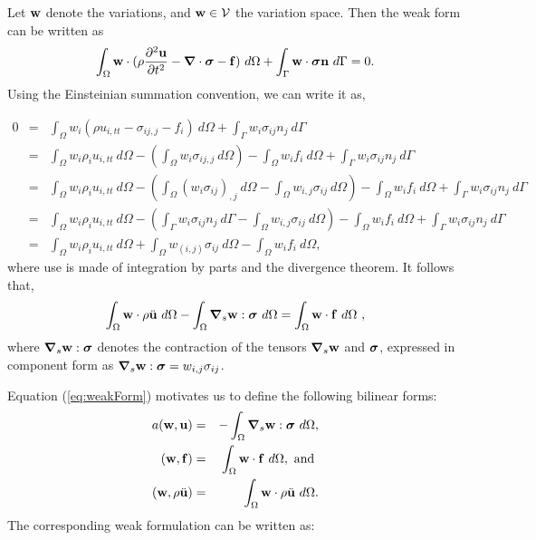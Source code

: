 Let $\mathbf{w}$ denote the variations, and $\mathbf{w} \in \mathcal{V}$ the variation space.
Then the weak form can be written as
\begin{equation}
\int_{\Omega} \mathbf{w}\cdot(\rho\frac{\partial^2 \mathbf{u}}{\partial t^2}-{\boldsymbol{\nabla}}\cdot{\boldsymbol{\sigma}} -\mathbf{f})~d\Omega + \int_{\Gamma} \mathbf{w}\cdot{\boldsymbol{\sigma}}\mathbf{n}~d\Gamma = 0.
\end{equation}
Using the Einsteinian summation convention, we can write it as,

\begin{eqnarray}
  0 & = & \int_{\Omega} w_i ( \rho u_{i, t t} - \sigma_{i j, j} - f_i )~d\Omega + \int_{\Gamma} w_i \sigma_{ij} n_j~d \Gamma \nonumber\\
	& = & \int_{\Omega} w_i \rho_i u_{i, t t}~d\Omega - 	
	\left(	\int_{\Omega} w_i\sigma_{ij,j}~d\Omega \right) -
  \int_{\Omega} w_i f_i~d\Omega + \int_{\Gamma} w_i \sigma_{ij} n_j~d\Gamma \nonumber\\
  & = & \int_{\Omega} w_i \rho_i u_{i, t t}~d\Omega - 	
	\left(	\int_{\Omega} (w_i\sigma_{ij})_{,j}~d\Omega - \int_{\Omega} w_{i,j}\sigma_{ij}~d\Omega \right) -
  \int_{\Omega} w_i f_i~d\Omega + \int_{\Gamma} w_i \sigma_{ij} n_j~d\Gamma \nonumber\\
	& = & \int_{\Omega} w_i \rho_i u_{i, t t}~d\Omega - 	
	\left( \int_{\Gamma} w_i \sigma_{ij} n_j~d\Gamma - \int_{\Omega} w_{i, j}\sigma_{ij}~d\Omega \right) -
  \int_{\Omega} w_i f_i~d\Omega + \int_{\Gamma} w_i \sigma_{ij} n_j~d\Gamma \nonumber\\
  & = & \int_{\Omega} w_i \rho_i u_{i, t t}~d\Omega + \int_{\Omega} w_{( i, j )} \sigma_{ij}~d\Omega - \int_{\Omega} w_i f_i~d\Omega,
\end{eqnarray}
where use is made of integration by parts and the divergence theorem. It follows that,
\begin{equation}
\label{eq:weakForm}
\int_{\Omega} \mathbf{w}\cdot\rho\ddot{\mathbf{u}} ~d\Omega - \int_{\Omega}{\boldsymbol{\nabla}}_s\mathbf{w}:{\boldsymbol{\sigma}} ~d\Omega = \int_{\Omega} \mathbf{w}\cdot\mathbf{f} ~d\Omega ~,
\end{equation}
where ${\boldsymbol{\nabla}}_s\mathbf{w}:{\boldsymbol{\sigma}}$ denotes the contraction of the tensors ${\boldsymbol{\nabla}}_s\mathbf{w}$ and ${\boldsymbol{\sigma}}$, expressed in component form as ${\boldsymbol{\nabla}}_s\mathbf{w}:{\boldsymbol{\sigma}}=w_{i,j}\sigma_{ij}$.

Equation (\ref{eq:weakForm}) motivates us to define the following bilinear forms:
\begin{eqnarray}
  a (\bw,\bu) & = & -\int_{\Omega}\div_s\bw:\stress ~d\Omega, \label{eq:bilinear} \\ %
  (\bw,\force) & = & \int_{\Omega} \bw\cdot\force ~d\Omega, ~\mbox{and}~ \\ %
  (\bw, \rho \ddot{\bu} ) & = & \int_{\Omega} \bw\cdot\rho\ddot{\bu} ~d\Omega. %
\end{eqnarray}
The corresponding weak formulation can be written as:

